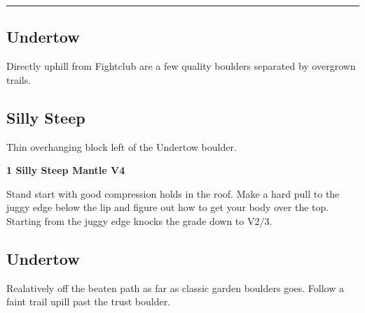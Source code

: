 \rule{\textwidth}{1pt}
\begin{multicols}{2}
		\section{Undertow}\label{sa:Undertow}
	\begin{minipage}{\columnwidth}
	Directly uphill from Fightclub are a few quality boulders separated by overgrown trails.
	\end{minipage}

			\subsection*{Silly Steep}\label{bf:Silly Steep}
			\begin{minipage}{\columnwidth}
			Thin overhanging block left of the Undertow boulder.
			\end{minipage}
			

					\begin{minipage}{\linewidth}	
					\label{rt:Silly Steep Mantle}\colorbox{RoyalBlue!20}{\textbf{1 Silly Steep Mantle V4 \ding{72}   }}
					\begin{adjustwidth}{0.5cm}{}				
					Stand start with good compression holds in the roof. Make a hard pull to the juggy edge below the lip and figure out how to get your body over the top. Starting from the juggy edge knocks the grade down to V2/3.
					\end{adjustwidth}
					\end{minipage}
			\subsection*{Undertow}\label{bf:Undertow}
			\begin{minipage}{\columnwidth}
			Realatively off the beaten path as far as classic garden boulders goes. Follow a faint trail upill past the trust boulder.
			\end{minipage}
			
\label{pt:Riptide}


\end{multicols}
